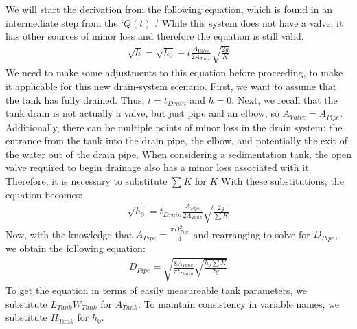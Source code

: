\documentclass[letterpaper,10pt,english]{sphinxmanual}
\begin{document}
We will start the derivation from the following equation, which is found in an intermediate step from the ‘\(Q(t)\) {\hyperref[\detokenize{Flow_Control_and_Measurement/FCM_Derivations:flow-for-a-tank-with-a-valve}]{}}.’ While this system does not have a valve, it has other sources of minor loss and therefore the equation is still valid.
\begin{equation}\label{equation:Flow_Control_and_Measurement/FCM_Derivations:Flow_Control_and_Measurement/FCM_Derivations:15}
\begin{split}\sqrt h  = \sqrt{h_0} - t \frac{A_{Valve}}{2 A_{Tank}} \sqrt {\frac{2g}{K}}\end{split}
\end{equation}
We need to make some adjustments to this equation before proceeding, to make it applicable for this new drain-system scenario. First, we want to assume that the tank has fully drained. Thus, \(t = t_{Drain}\) and \(h = 0\). Next, we recall that the tank drain is not actually a valve, but just pipe and an elbow, so \(A_{Valve} = A_{Pipe}\). Additionally, there can be multiple points of minor loss in the drain system: the entrance from the tank into the drain pipe, the elbow, and potentially the exit of the water out of the drain pipe. When considering a sedimentation tank, the open valve required to begin drainage also has a minor loss associated with it. Therefore, it is necessary to substitute \(\sum K\) for \(K\) With these substitutions, the equation becomes:
\begin{equation}\label{equation:Flow_Control_and_Measurement/FCM_Derivations:Flow_Control_and_Measurement/FCM_Derivations:16}
\begin{split}\sqrt{h_0}  = t_{Drain} \frac{A_{Pipe}}{2 A_{Tank}} \sqrt {\frac{2g}{\sum K}}\end{split}
\end{equation}
Now, with the knowledge that \(A_{Pipe} = \frac{\pi D_{Pipe}^2}{4}\) and rearranging to solve for \(D_{Pipe}\), we obtain the following equation:
\begin{equation}\label{equation:Flow_Control_and_Measurement/FCM_Derivations:Flow_Control_and_Measurement/FCM_Derivations:17}
\begin{split}D_{Pipe} = \sqrt{ \frac{8 A_{Tank}}{\pi t_{Drain}} \sqrt{ \frac{h_0 \sum K}{2g} } }\end{split}
\end{equation}
To get the equation in terms of easily measureable tank parameters, we substitute \(L_{Tank} W_{Tank}\) for \(A_{Tank}\). To maintain consistency in variable names, we substitute \(H_{Tank}\) for \(h_0\).
\end{document}
